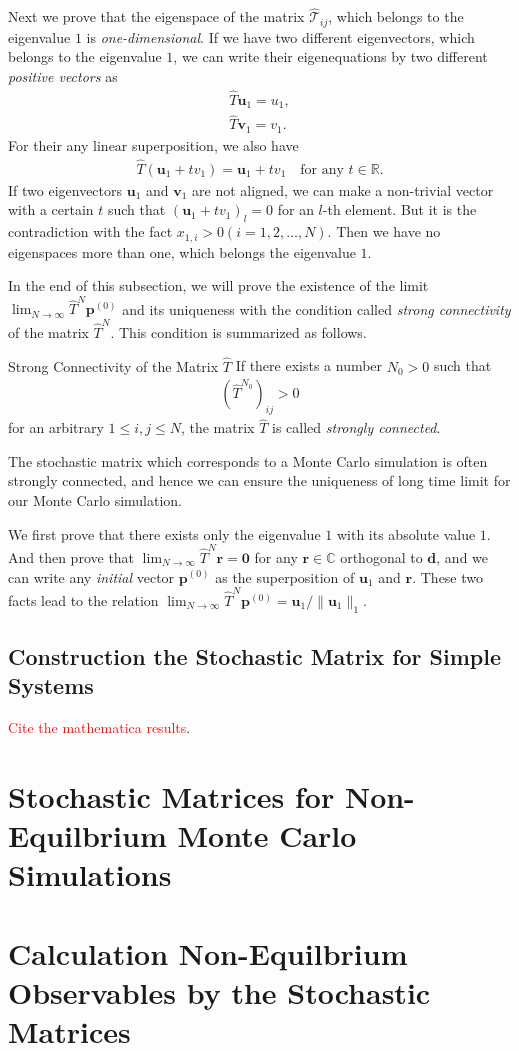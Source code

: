 Next we prove that the eigenspace of the matrix $\hat{\mathcal{T}}_{ij}$, which belongs to the eigenvalue $1$ is \textit{one-dimensional}. If we have two different eigenvectors, which belongs to the eigenvalue $1$, we can write their eigenequations by two different \textit{positive vectors} as
\begin{align}
\hat{T}\bm{u}_{1} = {u}_{1},\\
\hat{T}\bm{v}_{1} = {v}_{1}.
\end{align}
For their any linear superposition, we also have
\begin{align}
\hat{T}(\bm{u}_{1} + t{v}_{1}) = \bm{u}_{1} + t{v}_{1}\quad\text{for any $t\in\mathbb{R}$}.
\end{align}
If two eigenvectors $\bm{u}_{1}$ and $\bm{v}_{1}$ are not aligned, we can make a non-trivial vector with a certain $t$ such that $\left(\bm{u}_{1} + t{v}_{1}\right)_{l} = 0$ for an $l$-th element. But it is the contradiction with the fact $x_{1,i}>0(i=1,2,\dots,N)$. Then we have no eigenspaces more than one, which belongs the eigenvalue $1$.

In the end of this subsection, we will prove the existence of the limit $\lim_{N\to\infty}\hat{T}^{N}\bm{p}^{(0)}$ and its uniqueness with the condition called \textit{strong connectivity} of the matrix $\hat{T}^{N}$. This condition is summarized as follows.
\begin{itembox}{Strong Connectivity of the Matrix $\hat{T}$}
	If there exists a number $N_{0}>0$ such that
	\begin{align}
	\left(\hat{T}^{N_{0}}\right)_{ij}>0
	\end{align}
	for an arbitrary $1\leq i,j\leq N$, the matrix $\hat{T}$ is called \textit{strongly connected}.
\end{itembox}

The stochastic matrix which corresponds to a Monte Carlo simulation is often strongly connected, and hence we can ensure the uniqueness of long time limit for our Monte Carlo simulation.

We first prove that there exists only the eigenvalue $1$ with its absolute value $1$. And then prove that $\lim_{N\to\infty}\hat{T}^{N}\bm{r} = \bm{0}$ for any $\bm{r}\in\mathbb{C}$ orthogonal to $\bm{d}$, and we can write any \textit{initial} vector $\bm{p}^{(0)}$ as the superposition of $\bm{u}_{1}$ and $\bm{r}$. These two facts lead to the relation $\lim_{N\to\infty}\hat{T}^{N}\bm{p}^{(0)} = \bm{u}_{1}/\|\bm{u}_{1}\|_{1}$.

\subsection{Construction the Stochastic Matrix for Simple Systems}

\textcolor{red}{Cite the mathematica results}.

\section{Stochastic Matrices for Non-Equilbrium Monte Carlo Simulations}

\section{Calculation Non-Equilbrium Observables by the Stochastic Matrices}


